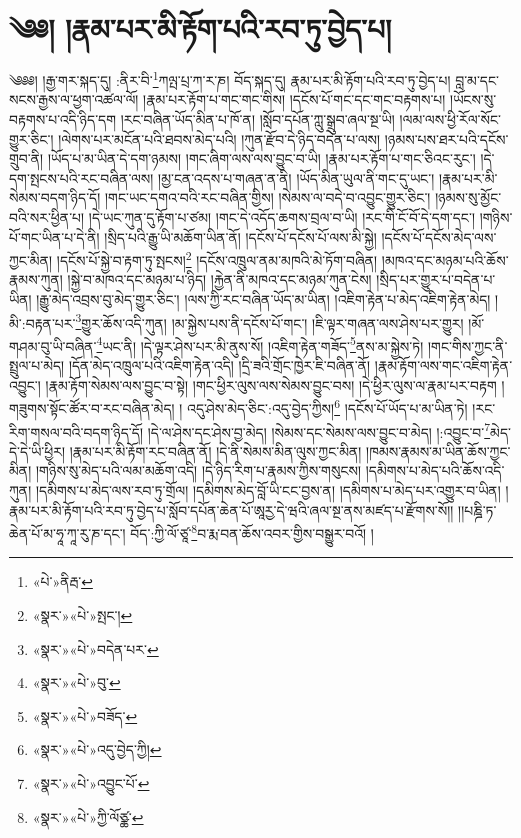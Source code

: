 \chapter{༄༅། །རྣམ་པར་མི་རྟོག་པའི་རབ་ཏུ་བྱེད་པ།}༄༅༅། །རྒྱ་གར་སྐད་དུ། :ནིར་བི་\footnote{«པེ་»ནིརྦ་}ཀལྤ་པྲ་ཀ་ར་ཎ། བོད་སྐད་དུ། རྣམ་པར་མི་རྟོག་པའི་རབ་ཏུ་བྱེད་པ། བླ་མ་དང་སངས་རྒྱས་ལ་ཕྱག་འཚལ་ལོ། །རྣམ་པར་རྟོག་པ་གང་གང་གིས། །དངོས་པོ་གང་དང་གང་བརྟགས་པ། །ཡོངས་སུ་བརྟགས་པ་འདི་ཉིད་དག །རང་བཞིན་ཡོད་མིན་པ་ཁོ་ན། །སློབ་དཔོན་ཀླུ་སྒྲུབ་ཞལ་སྔ་ཡི། །ལམ་ལས་ཕྱི་རོལ་སོང་གྱུར་ཅིང་། །ལེགས་པར་མངོན་པའི་ཐབས་མེད་པའི། །ཀུན་རྫོབ་དེ་ཉིད་བདེན་པ་ལས། །ཉམས་པས་ཐར་པའི་དངོས་གྲུབ་ནི། །ཡོད་པ་མ་ཡིན་དེ་དག་ཉམས། །གང་ཞིག་ལས་ལས་བྱུང་བ་ཡི། །རྣམ་པར་རྟོག་པ་གང་ཅིའང་རུང་། །དེ་དག་སྤངས་པའི་རང་བཞིན་ལས། །མྱ་ངན་འདས་པ་གཞན་ན་ནི། །ཡོད་མིན་ཡུལ་ནི་གང་དུ་ཡང་། །རྣམ་པར་མི་སེམས་བདག་ཉིད་དོ། །གང་ཡང་དགའ་བའི་རང་བཞིན་གྱིས། །སེམས་ལ་བདེ་བ་འབྱུང་གྱུར་ཅིང་། །ཉམས་སུ་མྱོང་བའི་སར་ཕྱིན་པ། །དེ་ཡང་ཀུན་དུ་རྟོག་པ་ཙམ། །གང་དེ་འདོད་ཆགས་བྲལ་བ་ཡི། །རང་གི་ངོ་བོ་དེ་དག་དང་། །གཉིས་པོ་གང་ཡིན་པ་དེ་ནི། །སྲིད་པའི་རྒྱུ་ཡི་མཆོག་ཡིན་ནོ། །དངོས་པོ་དངོས་པོ་ལས་མི་སྐྱེ། །དངོས་པོ་དངོས་མེད་ལས་ཀྱང་མིན། །དངོས་པོ་སྐྱེ་བ་རྟག་ཏུ་སྤངས།\footnote{«སྣར་»«པེ་»སྤང་།} །དངོས་འཁྲུལ་ནམ་མཁའི་མེ་ཏོག་བཞིན། །མཁའ་དང་མཉམ་པའི་ཆོས་རྣམས་ཀུན། །སྐྱེ་བ་མཁའ་དང་མཉམ་པ་ཉིད། །རྐྱེན་ནི་མཁའ་དང་མཉམ་ཀུན་ངེས། །སྲིད་པར་གྱུར་པ་བདེན་པ་ཡིན། །རྒྱུ་མེད་འབྲས་བུ་མེད་གྱུར་ཅིང་། །ལས་ཀྱི་རང་བཞིན་ཡོད་མ་ཡིན། །འཇིག་རྟེན་པ་མེད་འཇིག་རྟེན་མེད། །མི་:བརྟན་པར་\footnote{«སྣར་»«པེ་»བདེན་པར་}གྱུར་ཆོས་འདི་ཀུན། །མ་སྐྱེས་པས་ནི་དངོས་པོ་གང་། །ཇི་ལྟར་གཞན་ལས་ཤེས་པར་གྱུར། །མོ་གཤམ་བུ་ཡི་བཞིན་\footnote{«སྣར་»«པེ་»བུ་}ཡང་ནི། །དེ་ལྟར་ཤེས་པར་མི་ནུས་སོ། །འཇིག་རྟེན་གཟོད་\footnote{«སྣར་»«པེ་»བཟོད་}ནས་མ་སྐྱེས་ཏེ། །གང་གིས་ཀྱང་ནི་སྤྲུལ་པ་མེད། །དོན་མེད་འཁྲུལ་པའི་འཇིག་རྟེན་འདི། །དྲི་ཟའི་གྲོང་ཁྱེར་ཇི་བཞིན་ནོ། །རྣམ་རྟོག་ལས་གང་འཇིག་རྟེན་འབྱུང་། །རྣམ་རྟོག་སེམས་ལས་བྱུང་བ་སྟེ། །གང་ཕྱིར་ལུས་ལས་སེམས་བྱུང་བས། །དེ་ཕྱིར་ལུས་ལ་རྣམ་པར་བརྟག །གཟུགས་སྟོང་ཚོར་བ་རང་བཞིན་མེད། །
འདུ་ཤེས་མེད་ཅིང་:འདུ་བྱེད་ཀྱིས།\footnote{«སྣར་»«པེ་»འདུ་བྱེད་ཀྱི།} །དངོས་པོ་ཡོད་པ་མ་ཡིན་ཏེ། །རང་རིག་གསལ་བའི་བདག་ཉིད་དོ། །དེ་ལ་ཤེས་དང་ཤེས་བྱ་མེད། །སེམས་དང་སེམས་ལས་བྱུང་བ་མེད། །:འབྱུང་བ་\footnote{«སྣར་»«པེ་»འབྱུང་པོ་}མེད་དེ་དེ་ཡི་ཕྱིར། །རྣམ་པར་མི་རྟོག་རང་བཞིན་ནོ། །དེ་ནི་སེམས་མིན་ལུས་ཀྱང་མིན། །ཁམས་རྣམས་མ་ཡིན་ཆོས་ཀྱང་མིན། །གཉིས་སུ་མེད་པའི་ལམ་མཆོག་འདི། །དེ་ཉིད་རིག་པ་རྣམས་ཀྱིས་གསུངས། །དམིགས་པ་མེད་པའི་ཆོས་འདི་ཀུན། །དམིགས་པ་མེད་ལས་རབ་ཏུ་གྲོལ། །དམིགས་མེད་བློ་ཡི་ངང་བྱས་ན། །དམིགས་པ་མེད་པར་འགྱུར་བ་ཡིན། །རྣམ་པར་མི་རྟོག་པའི་རབ་ཏུ་བྱེད་པ་སློབ་དཔོན་ཆེན་པོ་ཨཱརྱ་དེ་ཝའི་ཞལ་སྔ་ནས་མཛད་པ་རྫོགས་སོ།། །།པཎྜི་ཏ་ཆེན་པོ་མ་ཧཱ་ཀཱ་རུ་ཎ་དང་། བོད་:ཀྱི་ལོ་ཙཱ་\footnote{«སྣར་»«པེ་»ཀྱི་ལོཙྪ་}བ་རྨ་བན་ཆོས་འབར་གྱིས་བསྒྱུར་བའོ། ། 